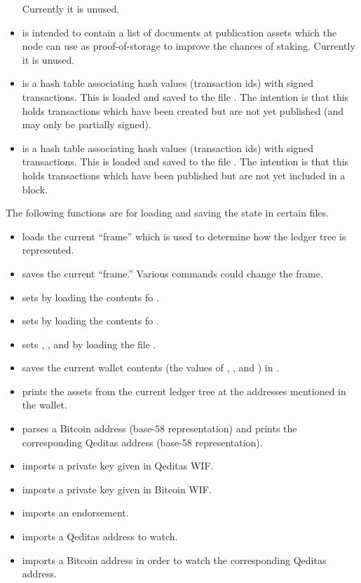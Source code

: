 \begin{itemize}
Currently it is unused.
\item {}
is intended to contain a list of documents at publication assets which the node can use as proof-of-storage to improve the chances of staking.
Currently it is unused.
\item {} is a hash table associating hash values (transaction ids)
with signed transactions. This is loaded and saved to the file {}.
The intention is that this holds transactions which have been created but
are not yet published (and may only be partially signed).
\item {} is a hash table associating hash values (transaction ids)
with signed transactions. This is loaded and saved to the file {}.
The intention is that this holds transactions which have been published
but are not yet included in a block.
\end{itemize}

The following functions are for loading and saving the state in certain files.
\begin{itemize}
\item {} loads the current ``frame'' which is used
to determine how the ledger tree is represented.
\item {} saves the current ``frame.'' Various commands
could change the frame.
\item {} sets {} by loading the contents fo {}.
\item {} sets {} by loading the contents fo {}.
\item {} sets {}, {},
{}
and {}
by loading the file {}.
\item {} saves the current wallet contents
(the values of {}, {},
{}
and {})
in {}.
\item {} prints the assets from the current ledger tree at the addresses
mentioned in the wallet.
\item {} parses a Bitcoin address (base-58 representation) and prints the corresponding Qeditas address (base-58 representation).
\item {} imports a private key given in Qeditas WIF.
\item {} imports a private key given in Bitcoin WIF.
\item {} imports an endorsement.
\item {} imports a Qeditas address to watch.
\item {} imports a Bitcoin address in order to watch the corresponding Qeditas address.
\end{itemize}

